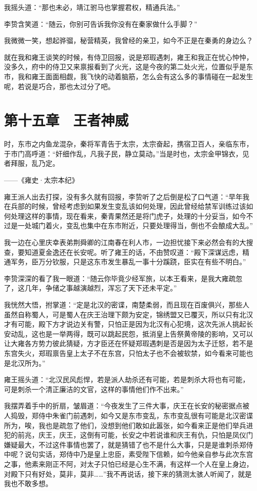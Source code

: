 我摇头道：“那也未必，靖江驸马也掌握君权，精通兵法。”

李贽含笑道：“随云，你别可告诉我你没有在秦家做什么手脚？”

我微微一笑，想起骅骝，秘营精英，我曾经的亲卫，如今不正是在秦勇的身边么？

就在我和雍王谈笑的时候，有侍卫回报，说是郑瑕遇刺，雍王和我正在忧心忡忡，没多久，府中的侍卫又来禀报看到了火光，这是今夜的第二处火光，位置似乎是东市，我和雍王面面相觑，我飞快的动着脑筋，怎么会有这么多的事情碰在一起发生呢，若说是巧合，那也太过分了吧。

\chapter{第十五章　王者神威}

时，东市之内鱼龙混杂，秦将军青告于太宗，太宗奋起，携宿卫百人，亲临东市，于市门高呼道：“奸细作乱，凡我子民，静立莫动。”当是时也，太宗金甲锦衣，见者拜服，乱乃定。

——《雍史·太宗本纪》

雍王派人出去打探，没有多久就有回报，李贽听了之后倒是松了口气道：“早年我在兵部的时候，曾经考虑到如果发生变乱该如何处理，因此曾经给禁军训练过该如何处理这样的事情，现在看来，秦青果然还是将门虎子，处理的十分妥当，如今不过是一处城门着火，变乱也集中在东市附近，只要处理得当，倒也不会酿成大乱。”

我一边在心里庆幸表弟荆舜卿的江南春在利人市，一边担忧接下来必然会有的大搜查，要知道夏金逸还在长安呢。听了雍王的话，不由赞叹道：“殿下深谋远虑，精通军务，臣万分钦服，只是这东市发生暴乱一事十分蹊跷，臣实在有些不明白。”

李贽深深的看了我一眼道：“随云你毕竟少经军旅，以本王看来，是我大雍疏忽了，这几年，争储之事越演越烈，浑忘了天下还未平定。”

我恍然大悟，拊掌道：“定是北汉的密谍，南楚柔弱，而且现在百废俱兴，那些人虽然自称蜀人，可是蜀人在庆王治理下颇为安定，锦绣盟又已覆灭，所以只有北汉才有可能，殿下方才说边关有警，只怕正是因为北汉有心犯境，这次先派人挑起长安动乱，这也是一举两得，既可以跳起民怨，抵消皇上告祭黄帝陵的影响，又可以让大雍各方势力彼此猜疑，方才臣还在怀疑郑瑕遇刺是否是因为太子迁怒，若不是东宫失火，郑瑕禀告皇上太子不在东宫，只怕太子也不会被软禁，如今看来可能也是北汉所为。”

雍王摇头道：“北汉民风彪悍，若是派人劫杀还有可能，若是刺杀大将也有可能，可是刺杀一个清正廉洁的文官，这样的事情他们作不出来。”

我摆弄着手中的折扇，皱眉道：“今夜发生了三件大事，庆王在长安的秘密据点被人捣毁，郑侍中朱雀门前遇刺，如今又是东市变乱，东市变乱很有可能是北汉密谍所为，唉，我也是疏忽了他们，没想到他们敢如此嚣张，如今看来正是他们举兵进犯的前兆，庆王，庆王，这倒有可能，长安之中若说谁和庆王有仇，只怕是凤仪门嫌疑最大，不过这件事情也罢了，就是猜错了也不是什么大事，只是是谁刺杀郑侍中呢？说句实话，郑侍中乃是皇上忠臣，素受陛下信赖，如今他亲自参与此次东宫之事，他素来刚正不阿，对太子只怕已经是心生不满，有这样一个人在皇上身边，对殿下只有好处，莫非，莫非……”我不再说话，接下来的猜测太骇人听闻了，就是我也不敢多想。

